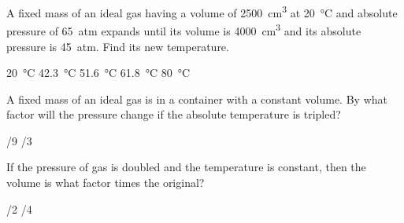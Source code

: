 \documentclass{../../../oss-ap12ibhl}
\begin{document}
\begin{questions}
  \question A fixed mass of an ideal gas having a volume of \SI{2500}{cm^3} at
  \SI{20}{\celsius} and absolute pressure of \SI{65}{atm} expands until its
  volume is \SI{4000}{cm^3} and its absolute pressure is \SI{45}{atm}. Find its
  new temperature.
  \begin{choices}
    \choice\SI{20}{\celsius}
    \choice\SI{42.3}{\celsius}
    \choice\SI{51.6}{\celsius}
    \choice\SI{61.8}{\celsius}
    \choice\SI{80}{\celsius}
  \end{choices}

  \question A fixed mass of an ideal gas is in a container with a constant
  volume. By what factor will the pressure change if the absolute temperature is
  tripled?
  \begin{choices}
    /9
    /3
  \end{choices}

  \question If the pressure of gas is doubled and the temperature is constant,
  then the volume is what factor times the original?
  \begin{choices}
    /2
    /4
  \end{choices}
  \newpage
  




\end{questions}
\end{document}
